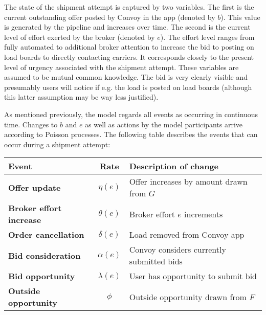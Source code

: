 \documentclass[12pt]{article}
\begin{document}
The state of the shipment attempt is captured by two variables. The first is the current outstanding offer posted by Convoy in the app (denoted by $b$). This value is generated by the pipeline and increases over time. The second is the current level of effort exerted by the broker (denoted by $e$). The effort level ranges from fully automated to additional broker attention to increase the bid to posting on load boards to directly contacting carriers. It corresponds closely to the present level of urgency associated with the shipment attempt. These variables are assumed to be mutual common knowledge. The bid is very clearly visible and presumably users will notice if e.g. the load is posted on load boards (although this latter assumption may be way less justified).

As mentioned previously, the model regards all events as occurring in continuous time. Changes to $b$ and $e$ as well as actions by the model participants arrive according to Poisson processes. The following table describes the events that can occur during a shipment attempt:

\begin{table}[htp]
\centering
\begin{tabular}{lcl}
\hline
\textbf{Event}                 & \textbf{Rate}                    & \textbf{Description of change}                  \\
\hline
\textbf{Offer update}           & $\eta\left(e\right)$    & Offer increases by amount drawn from $G$ \\
\textbf{Broker effort increase} & $\theta\left(e\right)$  & Broker effort $e$ increments           \\
\textbf{Order cancellation }     & $\delta\left(e\right)$  & Load removed from Convoy app           \\
\textbf{Bid consideration }     & $\alpha\left(e\right)$  & Convoy considers currently submitted bids           \\
\textbf{Bid opportunity }      & $\lambda\left(e\right)$ & User has opportunity to submit bid     \\
\textbf{Outside opportunity}   & $\phi$                  & Outside opportunity drawn from $F$    
\end{tabular}
\end{table}
\end{document}
